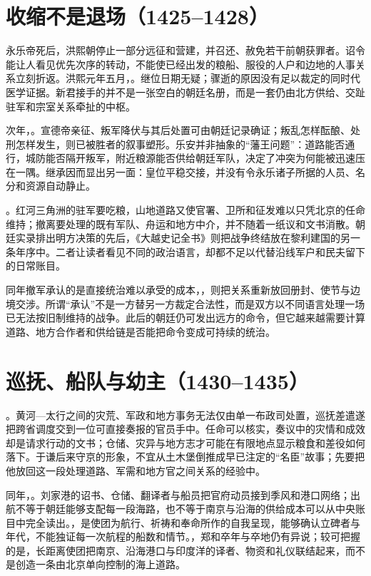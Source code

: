 \section{收缩不是退场（1425--1428）}

永乐帝死后，洪熙朝停止一部分远征和营建，并召还、赦免若干前朝获罪者。诏令能让人看见优先次序的转动，不能使已经出发的粮船、服役的人户和边地的人事关系立刻折返。洪熙元年五月，。继位日期无疑；骤逝的原因没有足以裁定的同时代医学证据。新君接手的并不是一张空白的朝廷名册，而是一套仍由北方供给、交趾驻军和宗室关系牵扯的中枢。

次年，。宣德帝亲征、叛军降伏与其后处置可由朝廷记录确证；叛乱怎样酝酿、处刑怎样发生，则已被胜者的叙事塑形。乐安并非抽象的“藩王问题”：道路能否通行，城防能否隔开叛军，附近粮源能否供给朝廷军队，决定了冲突为何能被迅速压在一隅。继承因而显出另一面：皇位平稳交接，并没有令永乐诸子所据的人员、名分和资源自动静止。

。红河三角洲的驻军要吃粮，山地道路又使官署、卫所和征发难以只凭北京的任命维持；撤离要处理的既有军队、舟运和地方中介，并不随着一纸议和文书消散。朝廷实录排出明方决策的先后，《大越史记全书》则把战争终结放在黎利建国的另一条年序中。二者让读者看见不同的政治语言，却都不足以代替沿线军户和民夫留下的日常账目。

同年撤军承认的是直接统治难以承受的成本，，则把关系重新放回册封、使节与边境交涉。所谓“承认”不是一方替另一方裁定合法性，而是双方以不同语言处理一场已无法按旧制维持的战争。此后的朝廷仍可发出远方的命令，但它越来越需要计算道路、地方合作者和供给链是否能把命令变成可持续的统治。

\section{巡抚、船队与幼主（1430--1435）}

。黄河—太行之间的灾荒、军政和地方事务无法仅由单一布政司处置，巡抚差遣遂把跨省调度交到一位可直接奏报的官员手中。任命可以核实，奏议中的灾情和成效却是请求行动的文书；仓储、灾异与地方志才可能在有限地点显示粮食和差役如何落下。于谦后来守京的形象，不宜从土木堡倒推成早已注定的“名臣”故事；先要把他放回这一段处理道路、军需和地方官之间关系的经验中。

同年，。刘家港的诏书、仓储、翻译者与船员把官府动员接到季风和港口网络；出航不等于朝廷能够支配每一段海路，也不等于南京与沿海的供给成本可以从中央账目中完全读出。，是使团为航行、祈祷和奉命所作的自我呈现，能够确认立碑者与年代，不能独证每一次航程的船数和情节。，郑和卒年与卒地仍有异说；较可把握的是，长距离使团把南京、沿海港口与印度洋的译者、物资和礼仪联结起来，而不是创造一条由北京单向控制的海上道路。

